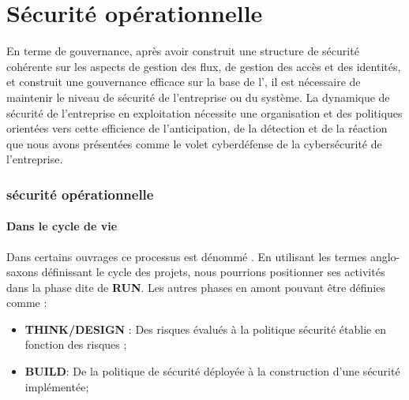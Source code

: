 %
%


\section{Sécurité opérationnelle}

En terme de gouvernance, après avoir construit une structure de sécurité cohérente sur les aspects de gestion des flux, de gestion des accès et des identités, et construit une gouvernance efficace sur la base de l', il est  nécessaire de maintenir le niveau de sécurité de l'entreprise ou du système. La dynamique de sécurité de l'entreprise en exploitation nécessite une organisation et des politiques orientées vers cette efficience de l'anticipation, de la détection et de la réaction que nous avons présentées comme le volet cyberdéfense de la cybersécurité de l'entreprise.

\begin{frame}
\frametitle<presentation>{sécurité opérationnelle}
\framesubtitle<presentation>{Dans le cycle de vie}
Dans certains ouvrages ce processus est dénommé  . En utilisant  les termes anglo-saxons définissant le cycle des projets, nous pourrions positionner ses activités dans la phase dite de  \textbf{RUN}. Les autres phases en amont pouvant être définies comme : 

\begin{itemize}
 \item \textbf{THINK/DESIGN} : Des risques évalués à la politique sécurité établie en fonction des risques ;
 \item \textbf{BUILD}: De la politique de sécurité déployée à la construction d’une sécurité implémentée;
\end{itemize}
\end{frame}


